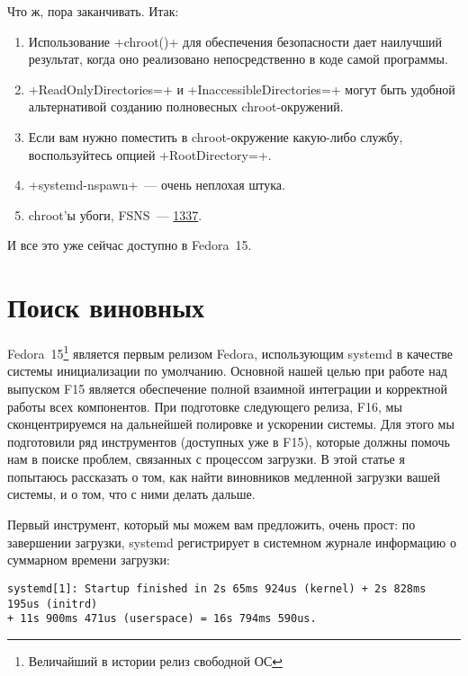 \documentclass[10pt,oneside,a4paper]{article}
\begin{document}
Что ж, пора заканчивать. Итак:
\begin{enumerate}
	\item Использование +chroot()+ для обеспечения безопасности дает
		наилучший результат, когда оно реализовано непосредственно в
		коде самой программы.
	\item +ReadOnlyDirectories=+ и +InaccessibleDirectories=+ могут быть
		удобной альтернативой созданию полновесных chroot-окружений.
	\item Если вам нужно поместить в chroot-окружение какую-либо службу,
		воспользуйтесь опцией +RootDirectory=+.
	\item +systemd-nspawn+~--- очень неплохая штука.
	\item chroot'ы убоги, FSNS~---
		\href{http://ru.wikipedia.org/wiki/Leet}{1337}.
\end{enumerate}

И все это уже сейчас доступно в Fedora~15.

\section{Поиск виновных}

Fedora~15\footnote{Величайший в истории релиз свободной ОС}
является первым релизом Fedora, использующим systemd в качестве системы
инициализации по умолчанию. Основной нашей целью при работе над выпуском F15
является обеспечение полной взаимной интеграции и корректной работы всех
компонентов. При подготовке следующего релиза, F16, мы сконцентрируемся на
дальнейшей полировке и ускорении системы. Для этого мы подготовили ряд
инструментов (доступных уже в F15), которые должны помочь нам в поиске проблем,
связанных с процессом загрузки. В этой статье я попытаюсь рассказать о том, как
найти виновников медленной загрузки вашей системы, и о том, что с ними делать
дальше.

Первый инструмент, который мы можем вам предложить, очень прост: по завершении
загрузки, systemd регистрирует в системном журнале информацию о суммарном
времени загрузки:
\begin{Verbatim}
systemd[1]: Startup finished in 2s 65ms 924us (kernel) + 2s 828ms 195us (initrd)
+ 11s 900ms 471us (userspace) = 16s 794ms 590us.
\end{Verbatim}
\end{document}
